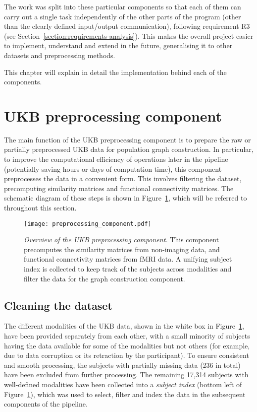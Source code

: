 The work was split into these particular components so that each of them can carry out a single task independently of the other parts of the program (other than the clearly defined input/output communication), following requirement R3 (see Section~\ref{section:requirements-analysis}). This makes the overall project easier to implement, understand and extend in the future, generalising it to other datasets and preprocessing methods. 

This chapter will explain in detail the implementation behind each of the components.

\section{UKB preprocessing component}
\label{section:ukb-preprocessing}

The main function of the UKB preprocessing component is to prepare the raw or partially preprocessed UKB data for population graph construction. In particular, to improve the computational efficiency of operations later in the pipeline (potentially saving hours or days of computation time), this component preprocesses the data in a convenient form. This involves filtering the dataset, precomputing similarity matrices and functional connectivity matrices. The schematic diagram of these steps is shown in Figure~\ref{preprocessing-component}, which will be referred to throughout this section.

\begin{figure}[h]
    \centering
    \texttt{[image: preprocessing\_component.pdf]}
    \caption{\textit{Overview of the UKB preprocessing component.} 
    This component precomputes the similarity matrices from non-imaging data, and functional connectivity matrices from fMRI data. A unifying subject index is collected to keep track of the subjects across modalities and filter the data for the graph construction component.
    }\label{preprocessing-component}
\end{figure}

\subsection{Cleaning the dataset}
The different modalities of the UKB data, shown in the white box in Figure~\ref{preprocessing-component}, have been provided separately from each other, with a small minority of subjects having the data available for some of the modalities but not others (for example, due to data corruption or its retraction by the participant). To ensure consistent and smooth processing, the subjects with partially missing data (236 in total) have been excluded from further processing. The remaining 17,314 subjects with well-defined modalities have been collected into a \textit{subject index} (bottom left of Figure~\ref{preprocessing-component}), which was used to select, filter and index the data in the subsequent components of the pipeline.

